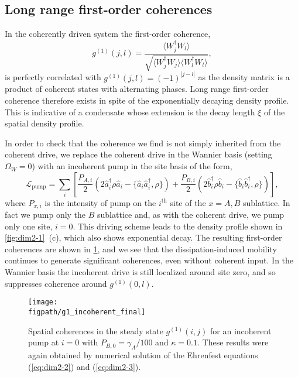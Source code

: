 \subsection{Long range first-order coherences}
In the coherently driven system the first-order coherence,
\begin{equation}
	g^{(1)}(j,l) = \frac{\langle W_{j}^{\dagger}W_{l} \rangle}{\sqrt{\langle W_{j}^{\dagger}W_{j} \rangle \langle W_{l}^{\dagger}W_{l} \rangle}},
	\label{eq:dim2-5}
\end{equation}
is perfectly correlated with \(g^{(1)}(j,l) = (-1)^{|j-l|}\) as the density matrix is a product of coherent states with alternating phases. Long range first-order coherence therefore exists in spite of the exponentially decaying density profile. This is indicative of a condensate whose extension is the decay length \(\xi\) of the spatial density profile.

In order to check that the coherence we find is not simply inherited from the coherent drive, we replace the coherent drive in the Wannier basis (setting \(\Omega_{W} = 0\)) with an incoherent pump in the site basis of the form,
\begin{equation}
	\mathcal{L}_{\mathrm{pump}} = \sum_{i}\left[\frac{P_{A,i}}{2}\left(2\hat{a}_{i}^{\dagger}\rho\hat{a}_{i} - \{\hat{a}_{i}\hat{a}_{i}^{\dagger}, \rho\}\right) + \frac{P_{B,i}}{2}\left(2\hat{b}_{i}^{\dagger}\rho\hat{b}_{i} - \{\hat{b}_{i}\hat{b}_{i}^{\dagger}, \rho\}\right) \right],
	\label{eq:dim2-6}
\end{equation}
where \(P_{x,i}\) is the intensity of pump on the \(i^{\mathrm{th}}\) site of the \(x = A,B\) sublattice. In fact we pump only the \(B\) sublattice and, as with the coherent drive, we pump only one site, \(i=0\). This driving scheme leads to the density profile shown in \cref{fig:dim2-1}~(c), which also shows exponential decay. The resulting first-order coherences are shown in \cref{fig:dim2-3}, and we see that the dissipation-induced mobility continues to generate significant coherences, even without coherent input. In the Wannier basis the incoherent drive is still localized around site zero, and so suppresses coherence around \(g^{(1)}(0,l)\).

\begin{figure}[ht!]
\centering
\texttt{[image: \\figpath/g1\_incoherent\_final]}
\caption{\label{fig:dim2-3}Spatial coherences in the steady state \(g^{(1)}(i,j)\) for an incoherent pump at \(i=0\) with \(P_{B,0} = \gamma_{A}/100\) and \(\kappa = 0.1\). These results were again obtained by numerical solution of the Ehrenfest equations (\ref{eq:dim2-2}) and (\ref{eq:dim2-3}).}
\end{figure}


